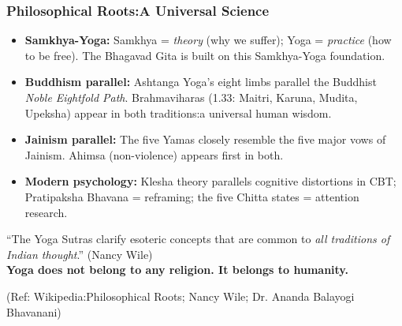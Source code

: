 \begin{frame}[fragile]\frametitle{Philosophical Roots:A Universal Science}

\begin{itemize}
\item \textbf{Samkhya-Yoga:} Samkhya = \emph{theory} (why we suffer); Yoga = \emph{practice} (how to be free). The Bhagavad Gita is built on this Samkhya-Yoga foundation.
\item \textbf{Buddhism parallel:} Ashtanga Yoga's eight limbs parallel the Buddhist \emph{Noble Eightfold Path}. Brahmaviharas (1.33: Maitri, Karuna, Mudita, Upeksha) appear in both traditions:a universal human wisdom.
\item \textbf{Jainism parallel:} The five Yamas closely resemble the five major vows of Jainism. Ahimsa (non-violence) appears first in both.
\item \textbf{Modern psychology:} Klesha theory parallels cognitive distortions in CBT; Pratipaksha Bhavana = reframing; the five Chitta states = attention research.
\end{itemize}

\begin{center}
{\small ``The Yoga Sutras clarify esoteric concepts that are common to \emph{all traditions of Indian thought}.'' (Nancy Wile)\\
\textbf{Yoga does not belong to any religion. It belongs to humanity.}}
\end{center}

\tiny{(Ref: Wikipedia:Philosophical Roots; Nancy Wile; Dr. Ananda Balayogi Bhavanani)}

\end{frame}


